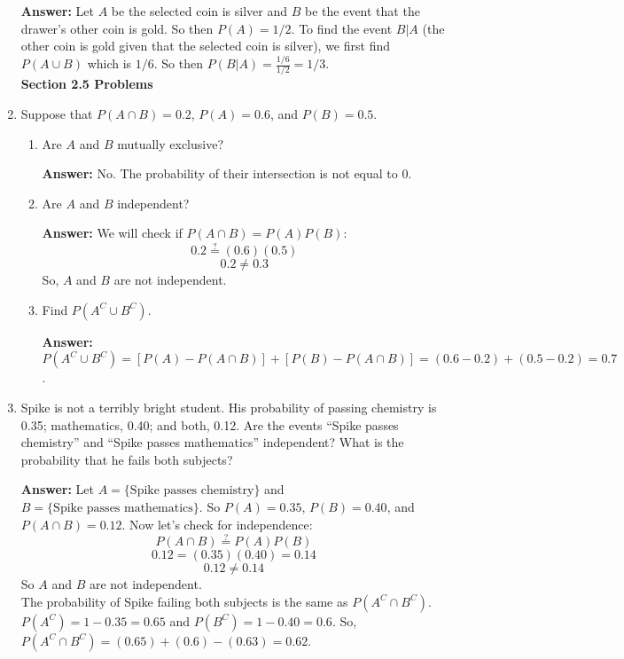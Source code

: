 \documentclass{article}
\begin{document}
\begin{enumerate}
        \textbf{Answer:} Let $A$ be the selected coin is silver and $B$ be the event that the drawer's other coin is gold. So then $P(A) = 1/2$. To find the event $B|A$ (the other coin is gold given that the selected coin is silver), we first find $P(A \cup B)$ which is $1/6$. So then $P(B|A) = \tfrac{1/6}{1/2} = 1/3$.\\
        
        \textbf{Section 2.5 Problems}
        
        \item Suppose that $P(A \cap B) = 0.2$, $P(A) = 0.6$, and $P(B) = 0.5$.
        
            \begin{enumerate}
                \item Are $A$ and $B$ mutually exclusive?
                
                \textbf{Answer:} No. The probability of their intersection is not equal to 0.\\
                
                \item Are $A$ and $B$ independent?
                
                \textbf{Answer:} We will check if $P(A \cap B) = P(A)P(B)$:
                    \[0.2 \stackrel{?}{=} (0.6)(0.5)\]
                    \[0.2 \neq 0.3\]
                So, $A$ and $B$ are not independent.
                
                \item Find $P(A^C \cup B^C)$.
                
                \textbf{Answer:} $P(A^C \cup B^C) = [P(A)-P(A \cap B)] + [P(B)-P(A \cap B)] = (0.6 - 0.2) + (0.5 - 0.2) = 0.7$.\\
                
            \end{enumerate}
        
        \item Spike is not a terribly bright student. His probability of passing chemistry is 0.35; mathematics, 0.40; and both, 0.12. Are the events “Spike passes chemistry” and “Spike passes mathematics” independent? What is the probability that he fails both subjects?
        
        \textbf{Answer:} Let $A = \{\text{Spike passes chemistry}\}$ and $B = \{\text{Spike passes mathematics}\}$. So $P(A) = 0.35$, $P(B) = 0.40$, and $P(A \cap B) = 0.12$. Now let's check for independence:\\
            \[P(A \cap B) \stackrel{?}{=} P(A)P(B)\]
            \[0.12 = (0.35)(0.40) = 0.14\]
            \[0.12 \neq 0.14\]
        So $A$ and $B$ are not independent.\\
        The probability of Spike failing both subjects is the same as $P(A^C \cap B^C)$. $P(A^C) = 1-0.35 = 0.65$ and $P(B^C) = 1-0.40 = 0.6$. So, $P(A^C \cap B^C) = (0.65)+(0.6)-(0.63) = 0.62$.
        

\end{enumerate}
\end{document}
